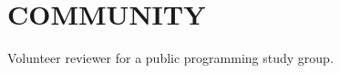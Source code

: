 \documentclass[main.tex]{subfiles}
\begin{document}
\section{COMMUNITY} {
  \drawline
  Volunteer reviewer for a public programming study group.
}
\end{document}
